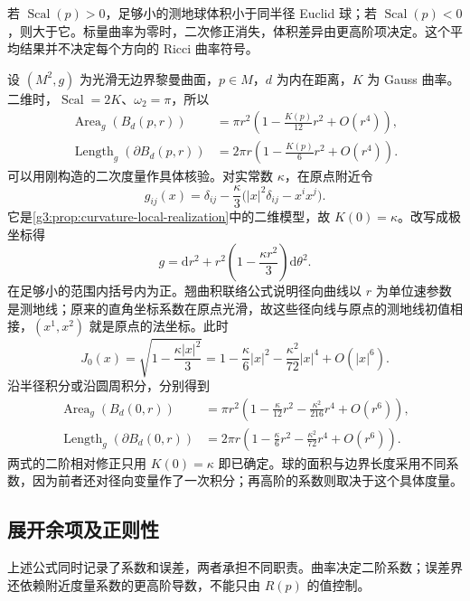 若 \(\operatorname{Scal}(p)>0\)，足够小的测地球体积小于同半径 Euclid 球；若 \(\operatorname{Scal}(p)<0\)，则大于它。标量曲率为零时，二次修正消失，体积差异由更高阶项决定。这个平均结果并不决定每个方向的 Ricci 曲率符号。

\begin{example}\label{g3:exm:surface-small-ball-check}
	设 \((M^2,g)\) 为光滑无边界黎曼曲面，\(p\in M\)，\(d\) 为内在距离，\(K\) 为 Gauss 曲率。二维时，\(\operatorname{Scal}=2K\)、\(\omega_2=\pi\)，所以
	\[
		\begin{aligned}
			\operatorname{Area}_g(B_d(p,r))
			&=\pi r^2\left(1-\frac{K(p)}{12}r^2+O(r^4)\right),\\
			\operatorname{Length}_g(\partial B_d(p,r))
			&=2\pi r\left(1-\frac{K(p)}6r^2+O(r^4)\right).
		\end{aligned}
	\]
	可以用刚构造的二次度量作具体核验。对实常数 \(\kappa\)，在原点附近令
	\[
		g_{ij}(x)=\delta_{ij}-\frac{\kappa}{3}
		\bigl(|x|^2\delta_{ij}-x^ix^j\bigr).
	\]
	它是\cref{g3:prop:curvature-local-realization}中的二维模型，故 \(K(0)=\kappa\)。改写成极坐标得
	\[
		g=\mathrm dr^2+r^2\left(1-\frac{\kappa r^2}{3}\right)\mathrm d\theta^2.
	\]
	在足够小的范围内括号内为正。翘曲积联络公式说明径向曲线以 \(r\) 为单位速参数是测地线；原来的直角坐标系数在原点光滑，故这些径向线与原点的测地线初值相接，\((x^1,x^2)\) 就是原点的法坐标。此时
	\[
		J_0(x)=\sqrt{1-\frac{\kappa|x|^2}{3}}
		=1-\frac{\kappa}{6}|x|^2-\frac{\kappa^2}{72}|x|^4+O(|x|^6).
	\]
	沿半径积分或沿圆周积分，分别得到
	\[
		\begin{aligned}
			\operatorname{Area}_g(B_d(0,r))
			&=\pi r^2\left(1-\frac{\kappa}{12}r^2
			-\frac{\kappa^2}{216}r^4+O(r^6)\right),\\
			\operatorname{Length}_g(\partial B_d(0,r))
			&=2\pi r\left(1-\frac{\kappa}{6}r^2
			-\frac{\kappa^2}{72}r^4+O(r^6)\right).
		\end{aligned}
	\]
	两式的二阶相对修正只用 \(K(0)=\kappa\) 即已确定。球的面积与边界长度采用不同系数，因为前者还对径向变量作了一次积分；再高阶的系数则取决于这个具体度量。
\end{example}

\subsection{展开余项及正则性}
\label{g3:subsec:0303:04}

上述公式同时记录了系数和误差，两者承担不同职责。曲率决定二阶系数；误差界还依赖附近度量系数的更高阶导数，不能只由 \(R(p)\) 的值控制。


